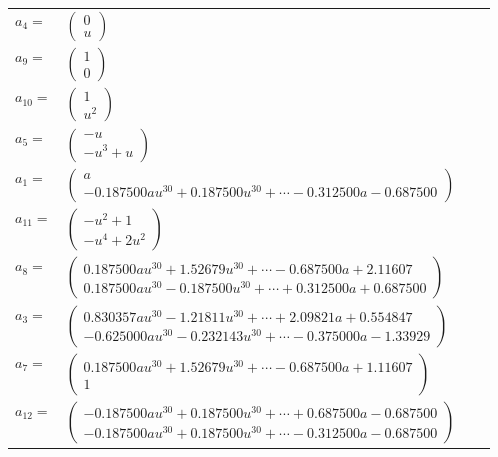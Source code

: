 \documentclass[1p]{elsarticle_modified}
\theoremstyle{definition}
\begin{document}
\begin{tabular}{m{7pt} m{180pt} m{7pt} m{180pt} }
\flushright $a_{4}=$&$\begin{pmatrix}0\\u\end{pmatrix}$ \\
\flushright $a_{9}=$&$\begin{pmatrix}1\\0\end{pmatrix}$ \\
\flushright $a_{10}=$&$\begin{pmatrix}1\\u^2\end{pmatrix}$ \\
\flushright $a_{5}=$&$\begin{pmatrix}- u\\- u^3+u\end{pmatrix}$ \\
\flushright $a_{1}=$&$\begin{pmatrix}a\\-0.187500 a u^{30}+0.187500 u^{30}+\cdots-0.312500 a-0.687500\end{pmatrix}$ \\
\flushright $a_{11}=$&$\begin{pmatrix}- u^2+1\\- u^4+2 u^2\end{pmatrix}$ \\
\flushright $a_{8}=$&$\begin{pmatrix}0.187500 a u^{30}+1.52679 u^{30}+\cdots-0.687500 a+2.11607\\0.187500 a u^{30}-0.187500 u^{30}+\cdots+0.312500 a+0.687500\end{pmatrix}$ \\
\flushright $a_{3}=$&$\begin{pmatrix}0.830357 a u^{30}-1.21811 u^{30}+\cdots+2.09821 a+0.554847\\-0.625000 a u^{30}-0.232143 u^{30}+\cdots-0.375000 a-1.33929\end{pmatrix}$ \\
\flushright $a_{7}=$&$\begin{pmatrix}0.187500 a u^{30}+1.52679 u^{30}+\cdots-0.687500 a+1.11607\\1\end{pmatrix}$ \\
\flushright $a_{12}=$&$\begin{pmatrix}-0.187500 a u^{30}+0.187500 u^{30}+\cdots+0.687500 a-0.687500\\-0.187500 a u^{30}+0.187500 u^{30}+\cdots-0.312500 a-0.687500\end{pmatrix}$ \\

\end{tabular}
\end{document}
